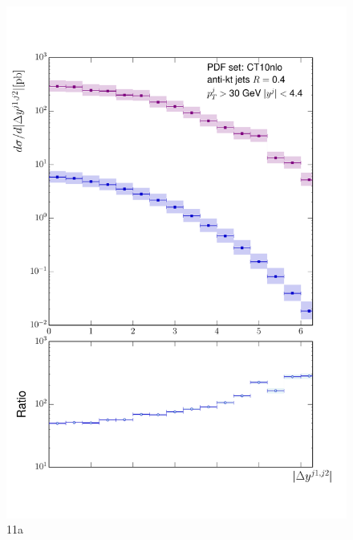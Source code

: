 	\begin{figure}[h]
		\centering
		\includegraphics[width=0.8\linewidth]{Figures/ATLAS_Z_100TeV_11a.pdf}
		\caption{11a}
		\label{fig:emissionsites}
	\end{figure}

